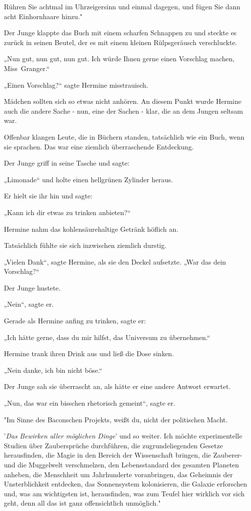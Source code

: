 {Rühren Sie achtmal im Uhrzeigersinn und einmal dagegen, und fügen Sie dann acht Einhornhaare hinzu."

Der Junge klappte das Buch mit einem scharfen Schnappen zu und steckte es zurück in seinen Beutel, der es mit einem kleinen Rülpsgeräusch verschluckte.

„Nun gut, nun gut, nun gut. Ich würde Ihnen gerne einen Vorschlag machen, Miss~Granger.“

„Einen Vorschlag?“ sagte Hermine misstrauisch.

Mädchen sollten sich so etwas nicht anhören. An diesem Punkt wurde Hermine auch die andere Sache - nun, eine der Sachen - klar, die an dem Jungen seltsam war.

Offenbar klangen Leute, die in Büchern standen, tatsächlich wie ein Buch, wenn sie sprachen. Das war eine ziemlich überraschende Entdeckung.

Der Junge griff in seine Tasche und sagte:

„Limonade“ und holte einen hellgrünen Zylinder heraus.

Er hielt sie ihr hin und sagte:

„Kann ich dir etwas zu trinken anbieten?“

Hermine nahm das kohlensäurehaltige Getränk höflich an.

Tatsächlich fühlte sie sich inzwischen ziemlich durstig.

„Vielen Dank“, sagte Hermine, als sie den Deckel aufsetzte. „War das dein Vorschlag?“

Der Junge hustete.

„Nein“, sagte er.

Gerade als Hermine anfing zu trinken, sagte er:

„Ich hätte gerne, dass du mir hilfst, das Universum zu übernehmen.“

Hermine trank ihren Drink aus und ließ die Dose sinken.

„Nein danke, ich bin nicht böse.“

Der Junge sah sie überrascht an, als hätte er eine andere Antwort erwartet.

„Nun, das war ein bisschen rhetorisch gemeint“, sagte er.

"Im Sinne des Baconschen Projekts, weißt du, nicht der politischen Macht.

'\emph{Das Bewirken aller möglichen Dinge}' und so weiter. Ich möchte experimentelle Studien über Zaubersprüche durchführen, die zugrundeliegenden Gesetze herausfinden, die Magie in den Bereich der Wissenschaft bringen, die Zauberer- und die Muggelwelt verschmelzen, den Lebensstandard des gesamten Planeten anheben, die Menschheit um Jahrhunderte voranbringen, das Geheimnis der Unsterblichkeit entdecken, das Sonnensystem kolonisieren, die Galaxie erforschen und, was am wichtigsten ist, herausfinden, was zum Teufel hier wirklich vor sich geht, denn all das ist ganz offensichtlich unmöglich."

}
